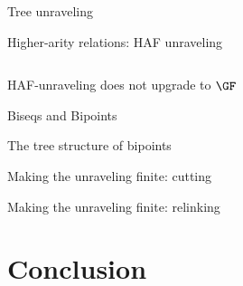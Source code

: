 \documentclass[aspectratio=169]{beamer}
\begin{document}

\begin{frame}{Tree unraveling}
  \begin{center}
    
  \end{center}
\end{frame}


\begin{frame}{Higher-arity relations: HAF unraveling}
  
  

  \begin{columns}
    \begin{column}{0.2\textwidth}
      \begin{overprint}


      \end{overprint}
    \end{column}
    \begin{column}{0.75\textwidth}
      \begin{overprint}
        \exunravelstruct{}


        \exunravelhat{}
      \end{overprint}
    \end{column}
  \end{columns}
\end{frame}

\begin{frame}{HAF-unraveling does not upgrade to $\GF$}
  
\end{frame}

\begin{frame}{Biseqs and Bipoints}
  
\end{frame}

\begin{frame}{The tree structure of bipoints}
  
\end{frame}

\begin{frame}{Making the unraveling finite: cutting}
  \begin{center}
    
  \end{center}
\end{frame}

\begin{frame}{Making the unraveling finite: relinking}
  
\end{frame}

\section{Conclusion}
\end{document}
